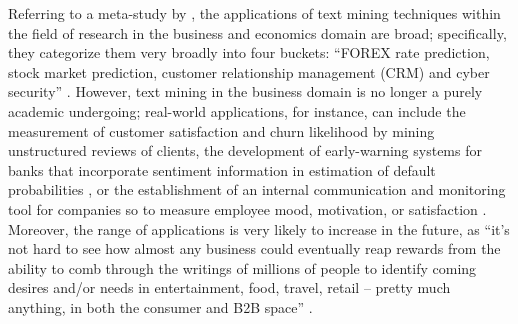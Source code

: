 Referring to a meta-study by \textcite{KumarRavi2016}, the applications of text mining techniques within the field of research in the business and economics domain are broad; specifically, they categorize them very broadly into four buckets: \enquote{FOREX rate prediction, stock market prediction, customer relationship management (CRM) and cyber security} \parencite[128]{KumarRavi2016}. However, text mining in the business domain is no longer a purely academic undergoing; real-world applications, for instance, can include the measurement of customer satisfaction and churn likelihood by mining unstructured reviews of clients, the development of early-warning systems for banks that incorporate sentiment information in estimation of default probabilities \parencite{McKinsey_2013}, or the establishment of an internal communication and monitoring tool for companies so to measure employee mood, motivation, or satisfaction \parencite{RMM_2015}. Moreover, the range of applications is very likely to increase in the future, as \enquote{it's not hard to see how almost any business could eventually reap rewards from the ability to comb through the writings of millions of people to identify coming desires and/or needs in entertainment, food, travel, retail -- pretty much anything, in both the consumer and B2B space} \parencite{TIME_2012}. 

